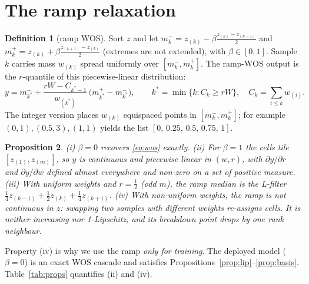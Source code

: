 \documentclass[11pt,a4paper]{article}
\newtheorem{proposition}{Proposition}
\theoremstyle{definition}
\newtheorem{definition}[proposition]{Definition}
\theoremstyle{remark}
\begin{document}
\section{The ramp relaxation}\label{sec:ramp}
\begin{definition}[ramp WOS]
Sort $z$ and let $m_k^-=z_{(k)}-\beta\frac{z_{(k)}-z_{(k-1)}}2$ and $m_k^+=z_{(k)}+\beta\frac{z_{(k+1)}-z_{(k)}}2$
(extremes are not extended), with $\beta\in[0,1]$. Sample $k$ carries mass $w_{(k)}$ spread uniformly over
$[m_k^-,m_k^+]$. The ramp-WOS output is the $r$-quantile of this piecewise-linear distribution:
\begin{equation}\label{eq:ramp}
y=m^-_{k^*}+\frac{rW-C_{k^*-1}}{w_{(k^*)}}\,\big(m^+_{k^*}-m^-_{k^*}\big),\qquad k^*=\min\{k:C_k\ge rW\},\quad C_k=\textstyle\sum_{i\le k}w_{(i)}.
\end{equation}
The integer version places $w_{(k)}$ equispaced points in $[m_k^-,m_k^+]$; for example $(0,1),(0.5,3),(1,1)$ yields the
list $[0,\,0.25,\,0.5,\,0.75,\,1]$.
\end{definition}

\begin{proposition}\label{prop:ramp}
(i) $\beta=0$ recovers \eqref{eq:wos} exactly.
(ii) For $\beta=1$ the cells tile $[z_{(1)},z_{(m)}]$, so $y$ is continuous and piecewise linear in $(w,r)$, with
$\partial y/\partial r$ and $\partial y/\partial w$ defined almost everywhere and non-zero on a set of positive measure.
(iii) With uniform weights and $r=\tfrac12$ (odd $m$), the ramp median is the L-filter $\tfrac14z_{(k-1)}+\tfrac12z_{(k)}+\tfrac14z_{(k+1)}$.
(iv) With non-uniform weights, the ramp is \emph{not} continuous in $z$: swapping two samples with different weights
re-assigns cells. It is neither increasing nor 1-Lipschitz, and its breakdown point drops by one rank neighbour.
\end{proposition}
Property (iv) is why we use the ramp \emph{only for training}. The deployed model ($\beta=0$) is an exact WOS cascade and
satisfies Propositions~\ref{prop:lip}--\ref{prop:basis}. Table~\ref{tab:props} quantifies (ii) and (iv).


\end{document}
